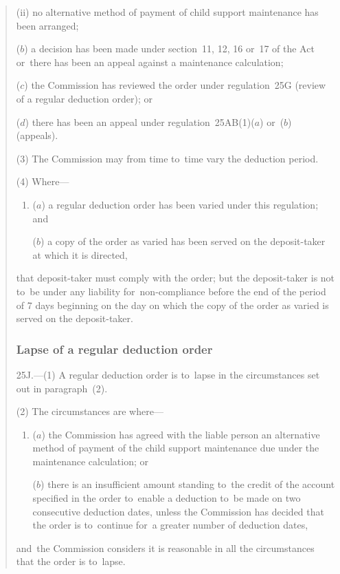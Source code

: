 \documentclass[12pt,a4paper]{article}
\begin{document}
\begin{quotation}
\begin{enumerate}
\begin{enumerate}
(ii) no alternative method of payment of child support maintenance has been arranged;
\end{enumerate}

($b$) a decision has been made under section~11, 12, 16 or~17 of the Act or~there has been an appeal against a maintenance calculation;

($c$) the Commission has reviewed the order under regulation~25G (review of a regular deduction order); or

($d$) there has been an appeal under regulation~25AB(1)($a$)  or~($b$)  (appeals).
\end{enumerate}

(3) The Commission may from time to~time vary the deduction period.

(4) Where—
\begin{enumerate}\item[]
($a$) a regular deduction order has been varied under this regulation; and

($b$) a copy of the order as varied has been served on the deposit-taker at which it is directed,
\end{enumerate}
that deposit-taker must comply with the order; but the deposit-taker is not to~be under any liability for~non-compliance before the end of the period of 7 days beginning on the day on which the copy of the order as varied is served on the deposit-taker.

\subsubsection*{Lapse of a regular deduction order}

25J.---(1)  A regular deduction order is to~lapse in the circumstances set out in  paragraph~(2).

(2) The circumstances are where—
\begin{enumerate}\item[]
($a$) the Commission has agreed with the liable person an alternative method of payment of the child support maintenance due under the maintenance calculation; or

($b$) there is an insufficient amount standing to~the credit of the account specified in the order to~enable a deduction to~be made on two consecutive deduction dates, unless the Commission has decided that the order is to~continue for~a greater number of deduction dates,
\end{enumerate}
and~the Commission considers it is reasonable in all the circumstances that the order is to~lapse.


\end{quotation}
\end{document}
